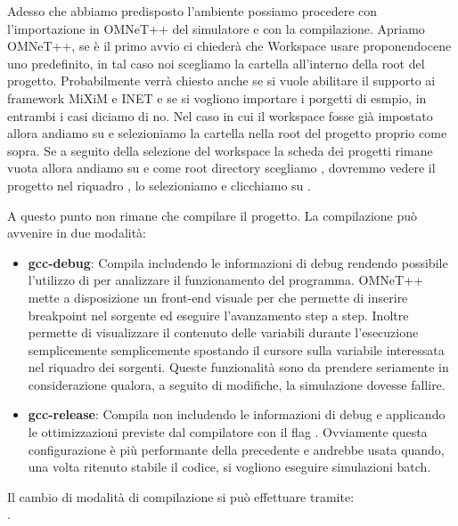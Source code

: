 Adesso che abbiamo predisposto l'ambiente possiamo procedere con l'importazione in OMNeT++ del simulatore e con la compilazione. Apriamo OMNeT++, se è il primo avvio ci chiederà che Workspace usare proponendocene uno predefinito, in tal caso noi scegliamo la cartella  all'interno della root del progetto. Probabilmente verrà chiesto anche se si vuole abilitare il supporto ai framework MiXiM e INET e se si vogliono importare i porgetti di esmpio, in entrambi i casi diciamo di no. Nel caso in cui il workspace fosse già impostato allora andiamo su  e selezioniamo la cartella  nella root del progetto proprio come sopra. Se a seguito della selezione del workspace  la scheda dei progetti rimane vuota allora andiamo su  e come root directory scegliamo , dovremmo vedere il progetto  nel riquadro , lo selezioniamo e clicchiamo su .

A questo punto non rimane che compilare il progetto. La compilazione può avvenire in due modalità:

\begin{itemize}
	\item \textbf{gcc-debug}: Compila includendo le informazioni di debug rendendo possibile l'utilizzo di  per analizzare il funzionamento del programma. OMNeT++ mette a disposizione un front-end visuale per  che permette di inserire breakpoint nel sorgente ed eseguire l'avanzamento step a step. Inoltre permette di visualizzare il contenuto delle variabili durante l'esecuzione semplicemente semplicemente spostando il cursore sulla variabile interessata nel riquadro dei sorgenti. Queste funzionalità sono da prendere seriamente in considerazione qualora, a seguito di modifiche, la simulazione dovesse fallire.
	\item \textbf{gcc-release}: Compila non includendo le informazioni di debug e applicando le ottimizzazioni previste dal compilatore  con il flag . Ovviamente questa configurazione è più performante della precedente e andrebbe usata quando, una volta ritenuto stabile il codice, si vogliono eseguire simulazioni batch.
\end{itemize}

Il cambio di modalità di compilazione si può effettuare tramite:\\ .

